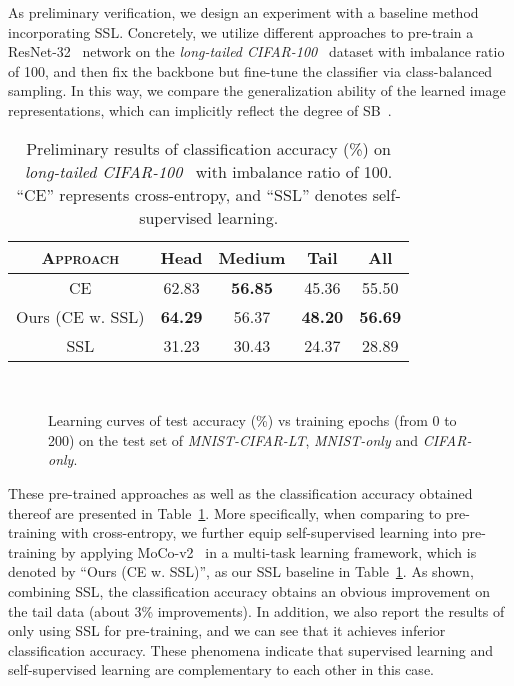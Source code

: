 \documentclass[10pt,journal,compsoc]{IEEEtran}
\begin{document}
As preliminary verification, we design an experiment with a baseline method incorporating SSL. Concretely, we utilize different approaches to pre-train a ResNet-32~\cite{he2016deep} network on the \emph{long-tailed CIFAR-100}~\cite{ldam} dataset with imbalance ratio of 100, and then fix the backbone but fine-tune the classifier via class-balanced sampling. In this way, we compare the generalization ability of the learned image representations, which can implicitly reflect the degree of SB~\cite{simpBiasNIPs20}.

\begin{table}[t]
\centering
\small
\caption{\small Preliminary results of classification accuracy (\%) on \emph{long-tailed CIFAR-100}~\cite{ldam} with imbalance ratio of 100. ``CE'' represents cross-entropy, and ``SSL'' denotes self-supervised learning.}
\begin{tabular}{c|cccc}
\toprule
\textsc{Approach}    & \textsf{Head}           & \textsf{Medium}         & \textsf{Tail}           & \textsf{All}            \\
\hline
CE        & 62.83          & \textbf{56.85} & 45.36          & 55.50     \bigstrut[t]     \\
Ours (CE w. SSL) & \textbf{64.29} & 56.37          & \textbf{48.20} & \textbf{56.69} \\
SSL       & 31.23          & 30.43          & 24.37          & 28.89         \\
\bottomrule                
\end{tabular}
\label{table:preSSL}
\end{table}

\begin{figure}[t!]
	\centering
	\\
\caption{\small Learning curves of test accuracy (\%) vs training epochs (from 0 to 200) on the test set of \emph{MNIST-CIFAR-LT}, \emph{MNIST-only} and \emph{CIFAR-only}.}
	\label{fig:curve}
\end{figure}

These pre-trained approaches as well as the classification accuracy obtained thereof are presented in Table~\ref{table:preSSL}. More specifically, when comparing to pre-training with cross-entropy, we further equip self-supervised learning into pre-training by applying MoCo-v2~\cite{mocov2} in a multi-task learning framework, which is denoted by ``Ours (CE w. SSL)'', as our SSL baseline in Table~\ref{table:preSSL}. As shown, combining SSL, the classification accuracy obtains an obvious improvement on the tail data (about 3\% improvements). In addition, we also report the results of only using SSL for pre-training, and we can see that it achieves inferior classification accuracy. These phenomena indicate that supervised learning and self-supervised learning are complementary to each other in this case.
\end{document}
